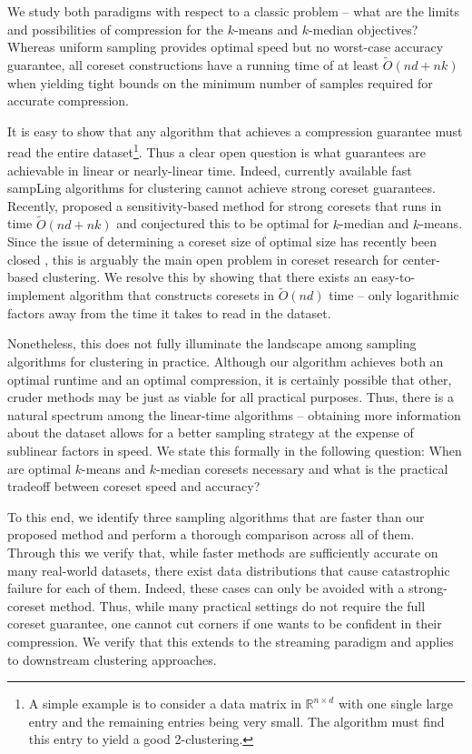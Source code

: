 We study both paradigms with respect to a classic problem -- what are the limits and possibilities of compression for the $k$-means and $k$-median objectives?
Whereas uniform sampling provides optimal speed but no worst-case accuracy guarantee, all coreset constructions have a running time of at least
$\tilde{O}(nd+nk)$ when yielding tight bounds on the minimum number of samples required for accurate compression. 

It is easy to show that any algorithm that achieves a compression guarantee must read the entire dataset\footnote{A simple example is to consider a data matrix
in $\mathbb{R}^{n \times d}$ with one single large entry and the remaining entries being very small. The algorithm must find this entry to yield a good
2-clustering.}. Thus a clear open question is what guarantees are achievable in linear or nearly-linear time. Indeed, currently available fast sampLing
algorithms for clustering \cite{lightweight_coresets} \cite{kmeans_sublinear_bachem16} cannot achieve strong coreset guarantees.  Recently, \cite{DSWY22} proposed
a sensitivity-based method for strong coresets that runs in time $\tilde{O}(nd + nk)$ and conjectured this to be optimal for $k$-median and $k$-means.  Since
the issue of determining a coreset size of optimal size has recently been closed \cite{CSS21,CLSSS22,huangLB}, this is arguably the main open problem in coreset
research for center-based clustering. We resolve this by showing that there exists an easy-to-implement algorithm that constructs coresets in $\tilde{O}(nd)$
time -- only logarithmic factors away from the time it takes to read in the dataset.

Nonetheless, this does not fully illuminate the landscape among sampling algorithms for clustering in practice. Although our algorithm achieves both an optimal
runtime and an optimal compression, it is certainly possible that other, cruder methods may be just as viable for all practical purposes.  Thus, there is
a natural spectrum among the linear-time algorithms -- obtaining more information about the dataset allows for a better sampling strategy at the expense of
sublinear factors in speed. We state this formally in the following question: When are optimal $k$-means and $k$-median coresets necessary and what is the
practical tradeoff between coreset speed and accuracy?

To this end, we identify three sampling algorithms that are faster than our proposed method and perform a thorough comparison across all of them. Through this
we verify that, while faster methods are sufficiently accurate on many real-world datasets, there exist data distributions that cause catastrophic failure for
each of them. Indeed, these cases can only be avoided with a strong-coreset method. Thus, while many practical settings do not require the full coreset
guarantee, one cannot cut corners if one wants to be confident in their compression. We verify that this extends to the streaming paradigm and applies to
downstream clustering approaches.


